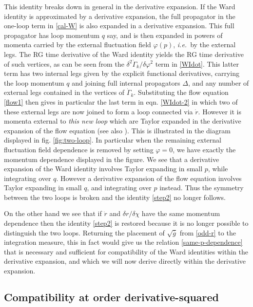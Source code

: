 \documentclass[11pt,a4paper]{article}
\numberwithin{figure}{section}
\numberwithin{equation}{section}
\newcommand\ie{\textit{i.e.}\ }
\begin{document}
This identity breaks down in general in the derivative expansion. If the Ward identity  is approximated by a derivative expansion, the full propagator in the one-loop term in \eqref{cal-W} is also expanded in a derivative expansion. This full propagator
 has loop momentum $q$ say, and is then expanded in powers of momenta carried by the external fluctuation field $\varphi(p)$, \ie by the external legs.
 The RG time derivative of the Ward identity yields the RG time derivative of such vertices, as can be seen from the $\delta^2\dot{\Gamma}_k/\delta\varphi^2$ term  in \eqref{WIdot}. This latter term has two internal legs given by the explicit functional derivatives, carrying the loop momentum $q$ and joining full internal propagators $\Delta$, and any number of external legs contained in the vertices of $\dot{\Gamma}_k$. Substituting the flow equation \eqref{flow1} then gives in particular the last term in eqn. \eqref{WIdot-2} in which two of these external legs are now joined to form a loop connected via $\dot{r}$. However it is momenta external to \emph{this new loop} which are Taylor expanded in the derivative expansion of the flow equation (see also \cite{Morris1999,Morris2001}). This is illustrated in the diagram displayed in fig. \ref{fig:two-loop}. In particular when the remaining external fluctuation field dependence is removed by setting $\varphi=0$, we have exactly the momentum dependence displayed in the figure. We see that a derivative expansion of the Ward identity involves Taylor expanding %
 in small $p$, while integrating over $q$. However a derivative expansion of the flow equation involves Taylor expanding %
 in small $q$, and integrating over $p$ instead. Thus the symmetry between the two loops is broken and the identity \eqref{step2} no longer follows.
 
 On the other hand we see that if $\dot{r}$ and $\delta r/\delta\chi$ have the same momentum dependence then the identity \eqref{step2} is restored because it is no longer possible to distinguish the two loops. Returning the placement of $\sqrt{\bar{g}}$ from \eqref{odd-r} to the integration measure, this in fact would give us the relation \eqref{same-p-dependence} that is necessary and sufficient for compatibility of the Ward identities within the derivative expansion, and which we will now derive directly within the derivative expansion.
 

\subsection{Compatibility at order derivative-squared}\label{sec:compatibility-at-d2}
\end{document}
